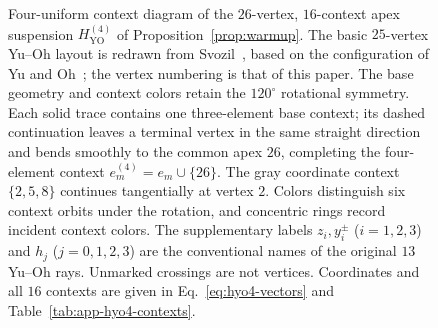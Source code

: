 \documentclass[
  aps,
  pra,
  reprint,
  superscriptaddress,
  amsmath,
  amssymb,
  nofootinbib,
  floatfix
]{revtex4-2}
\theoremstyle{definition}
\theoremstyle{remark}
\newcommand{\YO}{\mathrm{YO}}
\begin{document}
\begin{figure}[t]
{%
}
\caption{Four-uniform context diagram of the $26$-vertex, $16$-context apex suspension $H_{\YO}^{(4)}$ of Proposition~\ref{prop:warmup}. The basic $25$-vertex Yu--Oh layout is redrawn from Svozil~\cite[Fig.~1(a)]{svozil-2025-color}, based on the configuration of Yu and Oh~\cite{Yu-2012}; the vertex numbering is that of this paper. The base geometry and context colors retain the $120^\circ$ rotational symmetry. Each solid trace contains one three-element base context; its dashed continuation leaves a terminal vertex in the same straight direction and bends smoothly to the common apex $26$, completing the four-element context $e_m^{(4)}=e_m\cup\{26\}$. The gray coordinate context $\{2,5,8\}$ continues tangentially at vertex $2$. Colors distinguish six context orbits under the rotation, and concentric rings record incident context colors. The supplementary labels $z_i,y_i^\pm$ ($i=1,2,3$) and $h_j$ ($j=0,1,2,3$) are the conventional names of the original $13$ Yu--Oh rays. Unmarked crossings are not vertices. Coordinates and all $16$ contexts are given in Eq.~\eqref{eq:hyo4-vectors} and Table~\ref{tab:app-hyo4-contexts}.}\label{fig:hyo4}
\end{figure}
\end{document}
